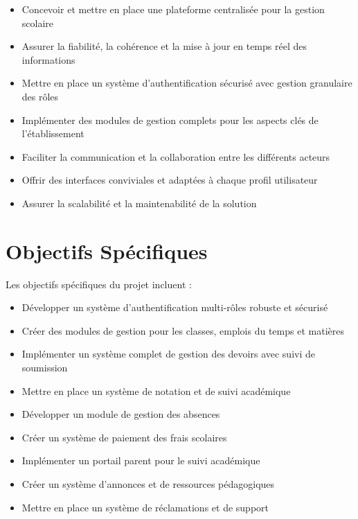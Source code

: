 \documentclass[12pt,a4paper]{report}
\begin{document}
    \begin{itemize}
        \item Concevoir et mettre en place une plateforme centralisée pour la gestion scolaire
        \item Assurer la fiabilité, la cohérence et la mise à jour en temps réel des informations
        \item Mettre en place un système d'authentification sécurisé avec gestion granulaire des rôles
        \item Implémenter des modules de gestion complets pour les aspects clés de l'établissement
        \item Faciliter la communication et la collaboration entre les différents acteurs
        \item Offrir des interfaces conviviales et adaptées à chaque profil utilisateur
        \item Assurer la scalabilité et la maintenabilité de la solution
    \end{itemize}

    \section{Objectifs Spécifiques}

    Les objectifs spécifiques du projet incluent :

    \begin{itemize}
        \item Développer un système d'authentification multi-rôles robuste et sécurisé
        \item Créer des modules de gestion pour les classes, emplois du temps et matières
        \item Implémenter un système complet de gestion des devoirs avec suivi de soumission
        \item Mettre en place un système de notation et de suivi académique
        \item Développer un module de gestion des absences
        \item Créer un système de paiement des frais scolaires
        \item Implémenter un portail parent pour le suivi académique
        \item Créer un système d'annonces et de ressources pédagogiques
        \item Mettre en place un système de réclamations et de support
    \end{itemize}
\end{document}

